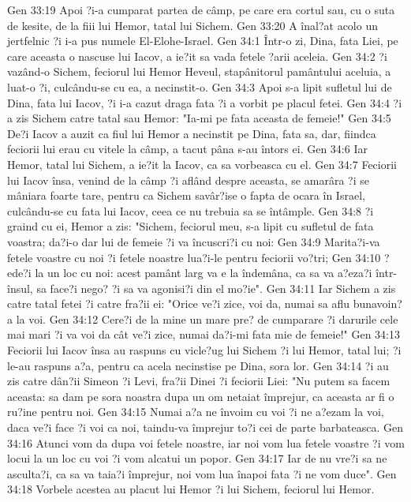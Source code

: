 Gen 33:19  Apoi ?i-a cumparat partea de câmp, pe care era cortul sau, cu o suta de kesite, de la fiii lui Hemor, tatal lui Sichem.
Gen 33:20  A înal?at acolo un jertfelnic ?i i-a pus numele El-Elohe-Israel.
Gen 34:1  Într-o zi, Dina, fata Liei, pe care aceasta o nascuse lui Iacov, a ie?it sa vada fetele ?arii aceleia.
Gen 34:2  ?i vazând-o Sichem, feciorul lui Hemor Heveul, stapânitorul pamântului aceluia, a luat-o ?i, culcându-se cu ea, a necinstit-o.
Gen 34:3  Apoi s-a lipit sufletul lui de Dina, fata lui Iacov, ?i i-a cazut draga fata ?i a vorbit pe placul fetei.
Gen 34:4  ?i a zis Sichem catre tatal sau Hemor: "Ia-mi pe fata aceasta de femeie!"
Gen 34:5  De?i Iacov a auzit ca fiul lui Hemor a necinstit pe Dina, fata sa, dar, fiindca feciorii lui erau cu vitele la câmp, a tacut pâna s-au întors ei.
Gen 34:6  Iar Hemor, tatal lui Sichem, a ie?it la Iacov, ca sa vorbeasca cu el.
Gen 34:7  Feciorii lui Iacov însa, venind de la câmp ?i aflând despre aceasta, se amarâra ?i se mâniara foarte tare, pentru ca Sichem savâr?ise o fapta de ocara în Israel, culcându-se cu fata lui Iacov, ceea ce nu trebuia sa se întâmple.
Gen 34:8  ?i graind cu ei, Hemor a zis: "Sichem, feciorul meu, s-a lipit cu sufletul de fata voastra; da?i-o dar lui de femeie ?i va încuscri?i cu noi:
Gen 34:9  Marita?i-va fetele voastre cu noi ?i fetele noastre lua?i-le pentru feciorii vo?tri;
Gen 34:10  ?ede?i la un loc cu noi: acest pamânt larg va e la îndemâna, ca sa va a?eza?i într-însul, sa face?i nego? ?i sa va agonisi?i din el mo?ie".
Gen 34:11  Iar Sichem a zis catre tatal fetei ?i catre fra?ii ei: "Orice ve?i zice, voi da, numai sa aflu bunavoin?a la voi.
Gen 34:12  Cere?i de la mine un mare pre? de cumparare ?i darurile cele mai mari ?i va voi da cât ve?i zice, numai da?i-mi fata mie de femeie!"
Gen 34:13  Feciorii lui Iacov însa au raspuns cu vicle?ug lui Sichem ?i lui Hemor, tatal lui; ?i le-au raspuns a?a, pentru ca acela necinstise pe Dina, sora lor.
Gen 34:14  ?i au zis catre dân?ii Simeon ?i Levi, fra?ii Dinei ?i feciorii Liei: "Nu putem sa facem aceasta: sa dam pe sora noastra dupa un om netaiat împrejur, ca aceasta ar fi o ru?ine pentru noi.
Gen 34:15  Numai a?a ne învoim cu voi ?i ne a?ezam la voi, daca ve?i face ?i voi ca noi, taindu-va împrejur to?i cei de parte barbateasca.
Gen 34:16  Atunci vom da dupa voi fetele noastre, iar noi vom lua fetele voastre ?i vom locui la un loc cu voi ?i vom alcatui un popor.
Gen 34:17  Iar de nu vre?i sa ne asculta?i, ca sa va taia?i împrejur, noi vom lua înapoi fata ?i ne vom duce".
Gen 34:18  Vorbele acestea au placut lui Hemor ?i lui Sichem, feciorul lui Hemor.
